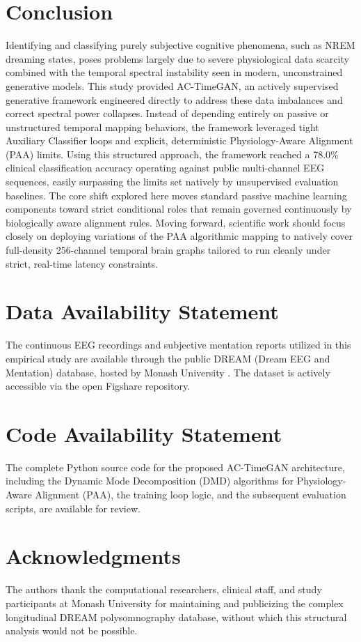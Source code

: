 \documentclass[journal,10pt,twocolumn]{IEEEtran}
\begin{document}
\section{Conclusion}
Identifying and classifying purely subjective cognitive phenomena, such as NREM dreaming states, poses problems largely due to severe physiological data scarcity combined with the temporal spectral instability seen in modern, unconstrained generative models. This study provided AC-TimeGAN, an actively supervised generative framework engineered directly to address these data imbalances and correct spectral power collapses. Instead of depending entirely on passive or unstructured temporal mapping behaviors, the framework leveraged tight Auxiliary Classifier loops and explicit, deterministic Physiology-Aware Alignment (PAA) limits. Using this structured approach, the framework reached a 78.0\% clinical classification accuracy operating against public multi-channel EEG sequences, easily surpassing the limits set natively by unsupervised evaluation baselines. The core shift explored here moves standard passive machine learning components toward strict conditional roles that remain governed continuously by biologically aware alignment rules. Moving forward, scientific work should focus closely on deploying variations of the PAA algorithmic mapping to natively cover full-density 256-channel temporal brain graphs tailored to run cleanly under strict, real-time latency constraints.

\section*{Data Availability Statement}
The continuous EEG recordings and subjective mentation reports utilized in this empirical study are available through the public DREAM (Dream EEG and Mentation) database, hosted by Monash University \cite{wong2023dream}. The dataset is actively accessible via the open Figshare repository.

\section*{Code Availability Statement}
The complete Python source code for the proposed AC-TimeGAN architecture, including the Dynamic Mode Decomposition (DMD) algorithms for Physiology-Aware Alignment (PAA), the training loop logic, and the subsequent evaluation scripts, are available for review.

\section*{Acknowledgments}
The authors thank the computational researchers, clinical staff, and study participants at Monash University for maintaining and publicizing the complex longitudinal DREAM polysomnography database, without which this structural analysis would not be possible.



\end{document}
